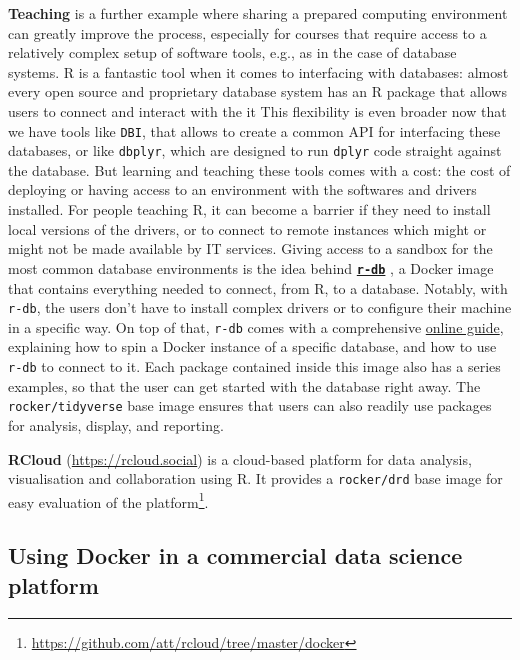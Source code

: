 \textbf{Teaching} is a further example where sharing a prepared
computing environment can greatly improve the process, especially for
courses that require access to a relatively complex setup of software
tools, e.g., as in the case of database systems. R is a fantastic tool
when it comes to interfacing with databases: almost every open source
and proprietary database system has an R package that allows users to
connect and interact with the it This flexibility is even broader now
that we have tools like \texttt{DBI}, that allows to create a common API
for interfacing these databases, or like \texttt{dbplyr}, which are
designed to run \texttt{dplyr} code straight against the database. But
learning and teaching these tools comes with a cost: the cost of
deploying or having access to an environment with the softwares and
drivers installed. For people teaching R, it can become a barrier if
they need to install local versions of the drivers, or to connect to
remote instances which might or might not be made available by IT
services. Giving access to a sandbox for the most common database
environments is the idea behind
\textbf{\href{https://github.com/ColinFay/r-db}{\texttt{r-db}}}
\citep{ColinFay}, a Docker image that contains everything needed to
connect, from R, to a database. Notably, with \texttt{r-db}, the users
don't have to install complex drivers or to configure their machine in a
specific way. On top of that, \texttt{r-db} comes with a comprehensive
\href{http://colinfay.me/r-db/}{online guide}, explaining how to spin a
Docker instance of a specific database, and how to use \texttt{r-db} to
connect to it. Each package contained inside this image also has a
series examples, so that the user can get started with the database
right away. The \texttt{rocker/tidyverse} base image ensures that users
can also readily use packages for analysis, display, and reporting.

\textbf{RCloud} (\url{https://rcloud.social}) is a cloud-based platform
for data analysis, visualisation and collaboration using R. It provides
a \texttt{rocker/drd} base image for easy evaluation of the
platform\footnote{\href{https://github.com/att/rcloud/tree/master/docker}{https://github.com/att/rcloud/tree/master/docker}}.

\hypertarget{using-docker-in-a-commercial-data-science-platform}{%
\subsection{Using Docker in a commercial data science
platform}\label{using-docker-in-a-commercial-data-science-platform}}

